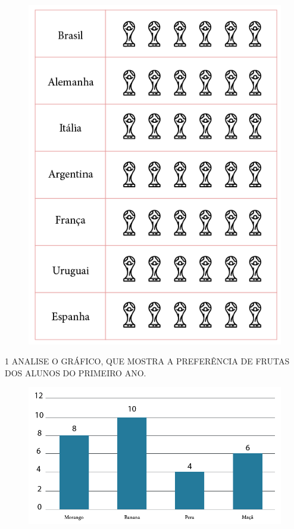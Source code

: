 \pagebreak

\begin{figure}[htpb!]
\centering
\includegraphics[width=\textwidth]{../ilustracoes/MAT1/SAEB_1ANO_MAT_FIGURA108.png}
\end{figure}


\num{1} ANALISE O GRÁFICO, QUE MOSTRA A PREFERÊNCIA DE FRUTAS DOS ALUNOS DO PRIMEIRO ANO.

\begin{figure}[htpb!]
\centering
\includegraphics[width=\textwidth]{../ilustracoes/MAT1/SAEB_1ANO_MAT_FIGURA109.png}
\end{figure}

